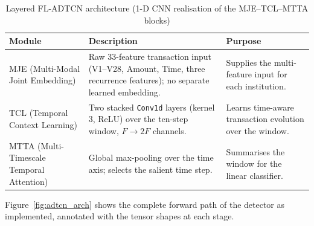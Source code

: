 \begin{table}[H]
\centering
\caption{Layered FL-ADTCN architecture (1-D CNN realisation of the MJE--TCL--MTTA blocks)}
\label{tab:fl_adtcn_arch}
\begin{tabular}{|p{2.9cm}|p{6.6cm}|p{4.0cm}|}
\hline
\textbf{Module} & \textbf{Description} & \textbf{Purpose} \\ \hline
MJE (Multi-Modal Joint Embedding) & Raw 33-feature transaction input (V1--V28, Amount, Time, three recurrence features); no separate learned embedding. & Supplies the multi-feature input for each institution. \\ \hline
TCL (Temporal Context Learning) & Two stacked \texttt{Conv1d} layers (kernel 3, ReLU) over the ten-step window, $F\!\to\!2F$ channels. & Learns time-aware transaction evolution over the window. \\ \hline
MTTA (Multi-Timescale Temporal Attention) & Global max-pooling over the time axis; selects the salient time step. & Summarises the window for the linear classifier. \\ \hline
\end{tabular}
\end{table}

Figure~\ref{fig:adtcn_arch} shows the complete forward path of the detector as implemented, annotated with the tensor shapes at each stage.

